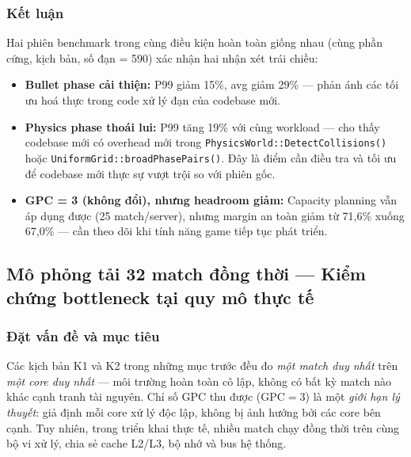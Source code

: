 \documentclass[12pt,a4paper]{report}
\begin{document}
\subsubsection*{Kết luận}

Hai phiên benchmark trong cùng điều kiện hoàn toàn giống nhau
(cùng phần cứng, kịch bản, số đạn = 590) xác nhận hai nhận xét trái chiều:

\begin{itemize}
  \item \textbf{Bullet phase cải thiện:} P99 giảm 15\%, avg giảm 29\% ---
        phản ánh các tối ưu hoá thực trong code xử lý đạn của codebase mới.

  \item \textbf{Physics phase thoái lui:} P99 tăng 19\% với cùng workload
        --- cho thấy codebase mới có overhead mới trong
        \texttt{PhysicsWorld::DetectCollisions()} hoặc
        \texttt{UniformGrid::broadPhasePairs()}.
        Đây là điểm cần điều tra và tối ưu để codebase mới thực sự vượt trội
        so với phiên gốc.

  \item \textbf{GPC = 3 (không đổi), nhưng headroom giảm:}
        Capacity planning vẫn áp dụng được (25 match/server), nhưng margin
        an toàn giảm từ 71{,}6\% xuống 67{,}0\% --- cần theo dõi khi
        tính năng game tiếp tục phát triển.
\end{itemize}

\subsection{Mô phỏng tải 32 match đồng thời --- Kiểm chứng bottleneck tại quy mô thực tế}

\subsubsection*{Đặt vấn đề và mục tiêu}

Các kịch bản K1 và K2 trong những mục trước đều đo \emph{một match duy nhất}
trên \emph{một core duy nhất} --- môi trường hoàn toàn cô lập, không có bất kỳ
match nào khác cạnh tranh tài nguyên. Chỉ số GPC thu được ($\text{GPC}=3$) là
một \emph{giới hạn lý thuyết}: giả định mỗi core xử lý độc lập, không bị ảnh
hưởng bởi các core bên cạnh. Tuy nhiên, trong triển khai thực tế, nhiều match
chạy đồng thời trên cùng bộ vi xử lý, chia sẻ cache L2/L3, bộ nhớ và
bus hệ thống.
\end{document}
